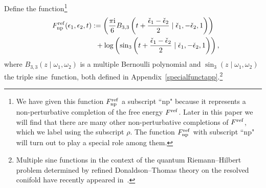 \documentclass[pdftex]{sigma}
\numberwithin{equation}{section}
\begin{document}
Define the function\footnote{We have given this function $F^{{\rm ref}}_{{\rm np}}$ a subscript ``np" because it represents a non-perturbative completion of the free energy $F^{{\rm ref}}$. Later in this paper we will find that there are many other non-perturbative completions of $F^{{\rm ref}}$, which we label using the subscript $\rho$. The function $F^{{\rm ref}}_{{\rm np}}$ with subscript ``np" will turn out to play a special role among them.}
\begin{gather}
F^{{\rm ref}}_{{\rm np}}(\epsilon_1,\epsilon_2,t) := \left(\frac{\pi \mathrm{i}}{6} B_{3,3}\left(t+\frac{\check\epsilon_1-\check\epsilon_2}{2} \mid \check{\epsilon}_1,-\check{\epsilon}_2,1 \right)\right) \nonumber\\
\hphantom{F^{{\rm ref}}_{{\rm np}}(\epsilon_1,\epsilon_2,t) :=}{} + \log\left(\sin_3\left(t+\frac{\check\epsilon_1-\check\epsilon_2}{2} \mid \check{\epsilon}_1,-\check{\epsilon}_2,1\right)\right),\label{refdifeqsol}
\end{gather}
where $B_{3,3}(z\mid \omega_1,\omega_2)$ is a multiple Bernoulli polynomial and $\sin_3(z\mid\omega_1,\omega_2)$ the triple sine~func\-tion, both defined in Appendix~\ref{specialfunctapp}.\footnote{Multiple sine functions in the context of the quantum Riemann--Hilbert problem determined by refined
Donaldson--Thomas theory on the resolved conifold have recently appeared in~\cite{Chuang:2022uey}.}
\end{document}
